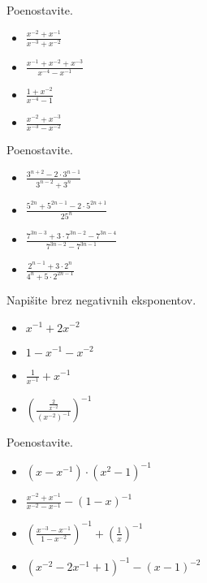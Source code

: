             \begin{naloga}
                Poenostavite.
                \begin{itemize}
                    \item $\frac{x^{-2}+x^{-1}}{x^{-3}+x^{-2}}$ 
                    \item $\frac{x^{-1}+x^{-2}+x^{-3}}{x^{-4}-x^{-1}}$ 
                    \item $\frac{1+x^{-2}}{x^{-4}-1}$ 
                    \item $\frac{x^{-2}+x^{-3}}{x^{-3}-x^{-2}}$ 
                \end{itemize}
            \end{naloga}


        
            \begin{naloga}
                Poenostavite.
                \begin{itemize}
                    \item $\frac{3^{n+2}-2\cdot 3^{n-1}}{3^{n-2}+3^n}$ 
                    \item $\frac{5^{2n}+5^{2n-1}-2\cdot 5^{2n+1}}{25^n}$ 
                    \item $\frac{7^{3n-3}+3\cdot 7^{3n-2}-7^{3n-4}}{7^{3n-2}-7^{3n-1}}$ 
                    \item $\frac{2^{n-1}+3\cdot 2^n}{4^n+5\cdot 2^{2n-1}}$ 
                \end{itemize}
            \end{naloga}


            \begin{naloga}
                Napišite brez negativnih eksponentov.
                \begin{itemize}
                    \item $x^{-1}+2x^{-2}$ 
                    \item $1-x^{-1}-x^{-2}$ 
                    \item $\frac{1}{x^{-1}}+x^{-1}$ 
                    \item $\left(\frac{\frac{2}{x^{-2}}}{\left(x^{-2}\right)^{-1}}\right)^{-1}$ 
                \end{itemize}
            \end{naloga}
        

            \begin{naloga}
                Poenostavite.
                \begin{itemize}
                    \item $\left(x-x^{-1}\right)\cdot\left(x^2-1\right)^{-1}$ 
                    \item $\frac{x^{-2}+x^{-1}}{x^{-2}-x^{-1}}-\left(1-x\right)^{-1}$ 
                    \item $\left(\frac{x^{-3}-x^{-1}}{1-x^{-2}}\right)^{-1}+\left(\frac{1}{x}\right)^{-1}$ 
                    \item $\left(x^{-2}-2x^{-1}+1\right)^{-1}-\left(x-1\right)^{-2}$ 
                \end{itemize}
            \end{naloga}

